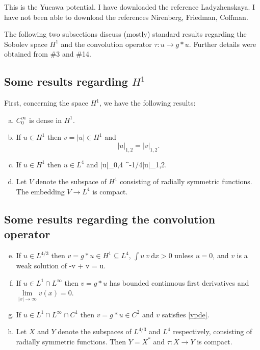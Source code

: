 {\new This is the Yucawa potential. I have downloaded the reference Ladyzhenskaya. I have not been able to download the references Nirenberg, Friedman, Coffman.}

The following two subsections discuss (mostly) standard results regarding the Sobolev space $H^1$ and the convolution operator $\tau: u \to g\ast u$. Further details were obtained from \#3 and \#14.

\subsection{Some results regarding $H^1$}
{\rewrite First, concerning the space $H^1$, we have the following results:}
{\done \begin{enumerate}[a)]
\item $C^\infty_0$ is dense in $H^1$.
\item If $u\in H^1$ then $v=|u|\in H^1$ and
$$|u|_{1,2}=|v|_{1,2}.$$
\item If $u\in H^1$ then $u\in L^4$ and
\be|u|_{0,4} ^{-1/4}|u|_{1,2}.\ee
\item Let $V$ denote the subspace of $H^1$ consisting of radially symmetric functions. The embedding $V \to L^4$ is compact.
\end{enumerate}}

\subsection{Some results regarding the convolution operator}
{\new \begin{enumerate}[a)]
\setcounter{enumi}{4}
\item If $u\in L^{4/3}$ then $v = g\ast u \in H^1\subseteq L^4$, $\int u~v~\mathrm{d} x>0$ unless $u=0$, and $v$ is a weak solution of 
\be \label{vpde} -\Delta v + v = u. \ee
\item If $u \in L^1\cap L^\infty$ then $v = g\ast u$ has bounded continuous first derivatives and 
$\underset{|x|\to\infty}{\lim} v(x) = 0$.
\item If $u\in L^1\cap L^\infty\cap C^1$ then $v = g\ast u\in C^2$ and $v$ satisfies \eqref{vpde}.
\item Let $X$ and $Y$ denote the subspaces of $L^{4/3}$ and $L^4$ respectively, consisting of radially symmetric functions. Then $Y = X^\ast$ and $\tau : X \to Y$ is compact.
\end{enumerate}}

